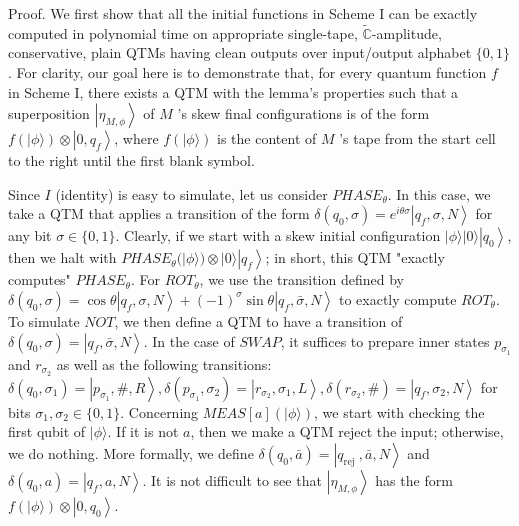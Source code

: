 \documentclass[10pt]{article}
\begin{document}
Proof. We first show that all the initial functions in Scheme I can be exactly computed in polynomial time on appropriate single-tape, $\tilde{\mathbb{C}}$-amplitude, conservative, plain QTMs having clean outputs over input/output alphabet $\{0,1\}$. For clarity, our goal here is to demonstrate that, for every quantum function $f$ in Scheme I, there exists a QTM with the lemma's properties such that a superposition $\left|\eta_{M, \phi}\right\rangle$ of $M$ 's skew final configurations is of the form $f(|\phi\rangle) \otimes\left|0, q_{f}\right\rangle$, where $f(|\phi\rangle)$ is the content of $M$ 's tape from the start cell to the right until the first blank symbol.

Since $I$ (identity) is easy to simulate, let us consider $P H A S E_{\theta}$. In this case, we take a QTM that applies a transition of the form $\delta\left(q_{0}, \sigma\right)=e^{i \theta \sigma}\left|q_{f}, \sigma, N\right\rangle$ for any bit $\sigma \in\{0,1\}$. Clearly, if we start with a skew initial configuration $|\phi\rangle|0\rangle\left|q_{0}\right\rangle$, then we halt with $P H A S E_{\theta}(|\phi\rangle) \otimes|0\rangle\left|q_{f}\right\rangle$; in short, this QTM "exactly computes" $P H A S E_{\theta}$. For $R O T_{\theta}$, we use the transition defined by $\delta\left(q_{0}, \sigma\right)=\cos \theta\left|q_{f}, \sigma, N\right\rangle+(-1)^{\sigma} \sin \theta\left|q_{f}, \bar{\sigma}, N\right\rangle$ to exactly compute $R O T_{\theta}$. To simulate $N O T$, we then define a QTM to have a transition of $\delta\left(q_{0}, \sigma\right)=\left|q_{f}, \bar{\sigma}, N\right\rangle$. In the case of $S W A P$, it suffices to prepare inner states $p_{\sigma_{1}}$ and $r_{\sigma_{2}}$ as well as the following transitions: $\delta\left(q_{0}, \sigma_{1}\right)=\left|p_{\sigma_{1}}, \#, R\right\rangle, \delta\left(p_{\sigma_{1}}, \sigma_{2}\right)=\left|r_{\sigma_{2}}, \sigma_{1}, L\right\rangle, \delta\left(r_{\sigma_{2}}, \#\right)=\left|q_{f}, \sigma_{2}, N\right\rangle$ for bits $\sigma_{1}, \sigma_{2} \in\{0,1\}$. Concerning $M E A S[a](|\phi\rangle)$, we start with checking the first qubit of $|\phi\rangle$. If it is not $a$, then we make a QTM reject the input; otherwise, we do nothing. More formally, we define $\delta\left(q_{0}, \bar{a}\right)=\left|q_{\text {rej }}, \bar{a}, N\right\rangle$ and $\delta\left(q_{0}, a\right)=\left|q_{f}, a, N\right\rangle$. It is not difficult to see that $\left|\eta_{M, \phi}\right\rangle$ has the form $f(|\phi\rangle) \otimes\left|0, q_{0}\right\rangle$.
\end{document}
